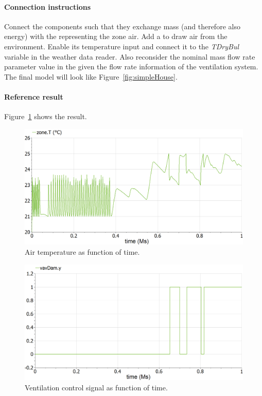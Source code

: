 \documentclass[10pt,a4paper]{article}
\begin{document}
\paragraph{Connection instructions}
Connect the components such that they exchange mass (and therefore also energy) with the  representing the zone air. Add a  to draw air from the environment. Enable its temperature input and connect it to the \textit{TDryBul} variable in the weather data reader. Also reconsider the nominal mass flow rate parameter value in the  given the flow rate information of the ventilation system. The final model will look like Figure~\ref{fig:simpleHouse}.

\paragraph{Reference result}
Figure~\ref{fig:res6} shows the result.
\begin{figure}[h]
\centering
\includegraphics[width=0.6\columnwidth]{result6.png}
\caption{Air temperature as function of time.}
\label{fig:res6}
\end{figure}
\begin{figure}[h]
	\centering
	\includegraphics[width=0.6\columnwidth]{result7.png}
	\caption{Ventilation control signal as function of time.}
	\label{fig:res7}
\end{figure}
\end{document}
